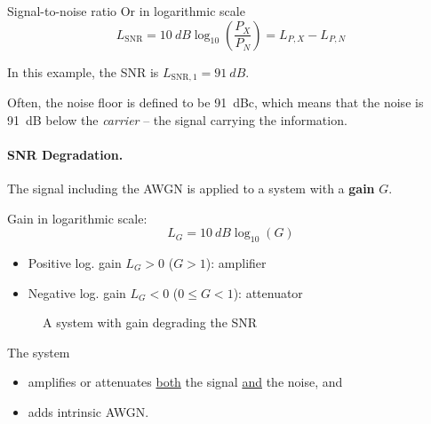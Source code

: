 \begin{refsection}
\begin{definition}{Signal-to-noise ratio}
	Or in logarithmic scale
	\begin{equation}
		L_{\mathrm{SNR}} = \SI{10}{dB} \log_{10} \left(\frac{P_{X}}{P_{N}}\right) = L_{P,X} - L_{P,N}
	\end{equation}
\end{definition}

In this example, the \ac{SNR} is $L_{\mathrm{SNR},1} = \SI{91}{dB}$.

Often, the noise floor is defined to be \SI{91}{dBc}, which means that the noise is \SI{91}{dB} below the  \emph{carrier} -- the signal carrying the information.

\paragraph{\ac{SNR} Degradation.}

The signal including the \ac{AWGN} is applied to a system with a  \textbf{gain} $G$.

Gain in logarithmic scale:
\begin{equation}
	L_G = \SI{10}{dB} \log_{10} \left(G\right)
\end{equation}

\begin{itemize}
	\item Positive log. gain $L_G > 0$ ($G > 1$): amplifier
	\item Negative log. gain $L_G < 0$ ($0 \leq G < 1$): attenuator
\end{itemize}

\begin{figure}[H]
	\centering
	\caption[A system with gain degrading the SNR]{A system with gain degrading the \ac{SNR}}
\end{figure}

The system
\begin{itemize}
	\item amplifies or attenuates \underline{both} the signal \underline{and} the noise, and
	\item adds intrinsic \ac{AWGN}.
\end{itemize}


\end{refsection}
